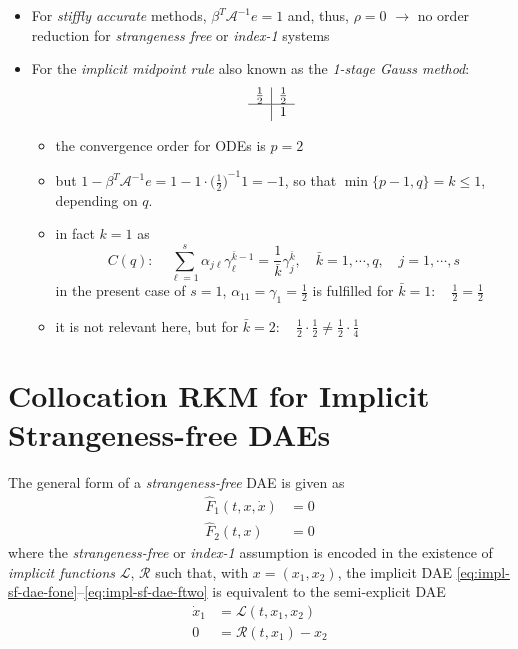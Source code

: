 \documentclass[]{book}
\providecommand{\tightlist}{%
  \setlength{\itemsep}{0pt}\setlength{\parskip}{0pt}}
\theoremstyle{definition}
\theoremstyle{definition}
\theoremstyle{definition}
\theoremstyle{definition}
\theoremstyle{remark}
\begin{document}
\begin{itemize}
\item
  For \emph{stiffly accurate} methods, \(\beta^T \mathcal A^{-1}e=1\) and, thus, \(\rho=0\) \(\rightarrow\) no order reduction for \emph{strangeness free} or \emph{index-1} systems
\item
  For the \emph{implicit midpoint rule} also known as the \emph{1-stage Gauss method}:
  \[
  \begin{array}{c|c}
  \frac 12 & \frac 12 \\
  \hline
   & 1  
  \end{array}
  \]

  \begin{itemize}
  \tightlist
  \item
    the convergence order for ODEs is \(p=2\)
  \item
    but \(1-\beta^T \mathcal A^{-1}e = 1- 1\cdot {\bigl(\frac 12\bigr)}^{-1} 1 = -1\), so that \(\min\{p-1, q\} = k \leq 1\), depending on \(q\).
  \item
    in fact \(k=1\) as
    \[
    C(q): \quad \sum_{\ell=1}^s\alpha_{j\ell}\gamma_\ell^{\bar k-1}=\frac{1}{\bar k} \gamma_j^{\bar k}, \quad {\bar k}=1,\cdots,q, \quad j=1,\cdots,s
    \]
    in the present case of \(s=1\), \(\alpha_{11}=\gamma_1=\frac 12\) is fulfilled for \({\bar k}=1: \quad \frac 12 = \frac 12\)
  \item
    it is not relevant here, but for \({\bar k}=2:\quad \frac 12 \cdot \frac 12 \neq \frac 12 \cdot \frac 14\)
  \end{itemize}
\end{itemize}

\hypertarget{collocation-rkm-for-implicit-strangeness-free-daes}{%
\section{Collocation RKM for Implicit Strangeness-free DAEs}\label{collocation-rkm-for-implicit-strangeness-free-daes}}

The general form of a \emph{strangeness-free} DAE is given as
\begin{align}
\hat F_1(t,x,\dot x) &= 0 \label{eq:impl-sf-dae-fone}\\
\hat F_2(t,x) &= 0 \label{eq:impl-sf-dae-ftwo}
\end{align}
where the \emph{strangeness-free} or \emph{index-1} assumption is encoded in the existence of \emph{implicit functions} \(\mathcal L\), \(\mathcal R\) such that, with \(x=(x_1,x_2)\), the implicit DAE \eqref{eq:impl-sf-dae-fone}--\eqref{eq:impl-sf-dae-ftwo} is equivalent to the semi-explicit DAE
\begin{align*}
  \dot x_1  &= \mathcal L(t,x_1,x_2) \\
   0 &= \mathcal R(t,x_1) -x_2
\end{align*}
\end{document}

